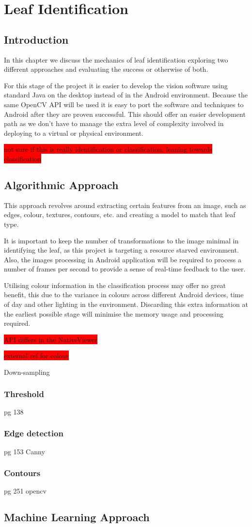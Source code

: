 \chapter{Leaf Identification}

\section{Introduction}
In this chapter we discuss the mechanics of leaf identification exploring two different approaches and evaluating the success or otherwise of both.

For this stage of the project it is easier to develop the vision software using standard Java on the desktop instead of in the Android environment. Because the same OpenCV API will be used it is easy to port the software and techniques to Android after they are proven successful. This should offer an easier development path as we don't have to manage the extra level of complexity involved in deploying to a virtual or physical environment. 

\colorbox{red}{not sure if this is really identification or classification, leaning towards classification}

\section{Algorithmic Approach}
This approach revolves around extracting certain features from an image, such as edges, colour, textures, contours, etc. and creating a model to match that leaf type.

It is important to keep the number of transformations to the image minimal in identifying the leaf, as this project is targeting a resource starved environment. Also, the images processing in Android application will be required to process a number of frames per second to provide a sense of real-time feedback to the user.

Utilising colour information in the classification process may offer no great benefit, this due to the variance in colours across different Android devices, time of day and other lighting in the environment. Discarding this extra information at the earliest possible stage will minimise the memory usage and processing required.

\colorbox{red}{API differs in the NativeViewer}

\colorbox{red}{external ref for colour}

Down-sampling

\subsection{Threshold}
pg 138

\subsection{Edge detection}
pg 153
Canny 

\subsection{Contours}
pg 251 opencv

\section{Machine Learning Approach}
